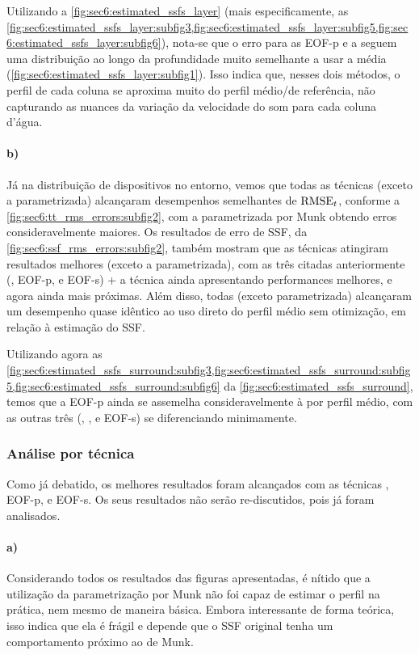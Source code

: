 Utilizando a \cref{fig:sec6:estimated_ssfs_layer} (mais especificamente, as \cref{fig:sec6:estimated_ssfs_layer:subfig3,fig:sec6:estimated_ssfs_layer:subfig5,fig:sec6:estimated_ssfs_layer:subfig6}), nota-se que o erro para as EOF-p e a  seguem uma distribuição ao longo da profundidade muito semelhante a usar a média (\cref{fig:sec6:estimated_ssfs_layer:subfig1}). Isso indica que, nesses dois métodos, o perfil de cada coluna se aproxima muito do perfil médio/de referência, não capturando as nuances da variação da velocidade do som para cada coluna d'água.

\paragraph{b)} Já na distribuição de dispositivos no entorno, vemos que todas as técnicas (exceto a parametrizada) alcançaram desempenhos semelhantes de $\operatorname{RMSE}_{t}$, conforme a \cref{fig:sec6:tt_rms_errors:subfig2}, com a parametrizada por Munk obtendo erros consideravelmente maiores. Os resultados de erro de SSF, da \cref{fig:sec6:ssf_rms_errors:subfig2}, também mostram que as técnicas atingiram resultados melhores (exceto a parametrizada), com as três citadas anteriormente (, EOF-p, e EOF-s) + a técnica  ainda apresentando performances melhores, e agora ainda mais próximas. Além disso, todas (exceto parametrizada) alcançaram um desempenho quase idêntico ao uso direto do perfil médio sem otimização, em relação à estimação do SSF.

Utilizando agora as \cref{fig:sec6:estimated_ssfs_surround:subfig3,fig:sec6:estimated_ssfs_surround:subfig5,fig:sec6:estimated_ssfs_surround:subfig6} da \cref{fig:sec6:estimated_ssfs_surround}, temos que a EOF-p ainda se assemelha consideravelmente à por perfil médio, com as outras três (, , e EOF-s) se diferenciando minimamente.

\subsubsection*{Análise por técnica}

Como já debatido, os melhores resultados foram alcançados com as técnicas , EOF-p, e EOF-s. Os seus resultados não serão re-discutidos, pois já foram analisados.

\paragraph{a)} Considerando todos os resultados das figuras apresentadas, é nítido que a utilização da parametrização por Munk não foi capaz de estimar o perfil na prática, nem mesmo de maneira básica. Embora interessante de forma teórica, isso indica que ela é frágil e depende que o SSF original tenha um comportamento próximo ao de Munk.

